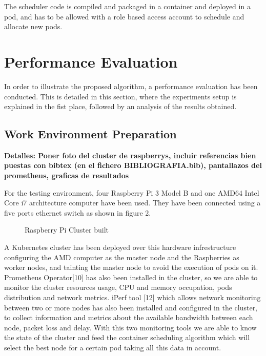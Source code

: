 \documentclass[conference]{IEEEtran}
\begin{document}
The scheduler code is compiled and packaged in a container and deployed in a pod, and has to be allowed with a role based access account to schedule
and allocate new pods.


\section{Performance Evaluation}\label{sec:eval}

In order to illustrate the proposed algorithm, a performance evaluation has been conducted. This is detailed in this section, where the experiments setup is explained in the fist place, followed by an analysis of the results obtained. 


\subsection{Work Environment Preparation}\label{sec:env}


\textbf{Detalles: Poner foto del cluster de raspberrys, incluir referencias bien puestas con bibtex (en el fichero BIBLIOGRAFIA.bib), pantallazos del prometheus, graficas de resultados}

For the testing environment, four Raspberry Pi 3 Model B and one AMD64 Intel Core i7 architecture computer have been used. They have been connected using a five ports ethernet switch as shown in figure 2. 

\begin{figure}[h]
\begin{center}
\strut{}
\caption{Raspberry Pi Cluster built}\label{fig:cluster}
\end{center}
\end{figure}

A Kubernetes cluster has been deployed over this hardware infrestructure configuring the AMD computer as the master node and
the Raspberries as worker nodes, and tainting the master node to avoid the execution of pods on it. Prometheus Operator[10] 
has also been installed in the cluster, so we are able to monitor the cluster resources usage, CPU and memory occupation, pods distribution and network metrics.
iPerf tool [12] which allows network monitoring between two or more nodes has also been installed and configured in the cluster, to collect information and metrics
about the available bandwidth between each node, packet loss and delay. With this two monitoring tools we are able to know the state of the cluster and feed the
container scheduling algorithm which will select the best node for a certain pod taking all this data in account.
\end{document}
